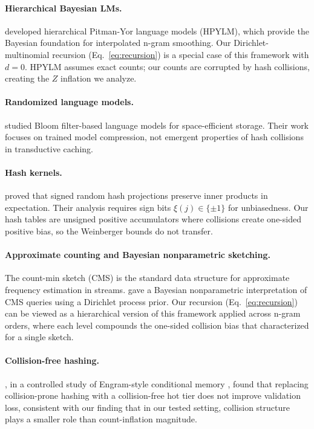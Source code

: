 \documentclass[11pt]{article}
\begin{document}
\paragraph{Hierarchical Bayesian LMs.} \citet{teh2006hierarchical} developed hierarchical Pitman-Yor language models (HPYLM), which provide the Bayesian foundation for interpolated n-gram smoothing. Our Dirichlet-multinomial recursion (Eq.~\ref{eq:recursion}) is a special case of this framework with $d = 0$. HPYLM assumes exact counts; our counts are corrupted by hash collisions, creating the $Z$ inflation we analyze.

\paragraph{Randomized language models.} \citet{talbot2007smoothed} studied Bloom filter-based language models for space-efficient storage. Their work focuses on trained model compression, not emergent properties of hash collisions in transductive caching.

\paragraph{Hash kernels.} \citet{weinberger2009feature} proved that signed random hash projections preserve inner products in expectation. Their analysis requires sign bits $\xi(j) \in \{\pm 1\}$ for unbiasedness. Our hash tables are unsigned positive accumulators where collisions create one-sided positive bias, so the Weinberger bounds do not transfer.

\paragraph{Approximate counting and Bayesian nonparametric sketching.} The count-min sketch (CMS) \citep{cormode2005improved} is the standard data structure for approximate frequency estimation in streams. \citet{cai2018bayesian} gave a Bayesian nonparametric interpretation of CMS queries using a Dirichlet process prior. Our recursion (Eq.~\ref{eq:recursion}) can be viewed as a hierarchical version of this framework applied across n-gram orders, where each level compounds the one-sided collision bias that \citet{cai2018bayesian} characterized for a single sketch.

\paragraph{Collision-free hashing.} \citet{lin2026engram}, in a controlled study of Engram-style conditional memory \citep{cheng2026engram}, found that replacing collision-prone hashing with a collision-free hot tier does not improve validation loss, consistent with our finding that in our tested setting, collision structure plays a smaller role than count-inflation magnitude.
\end{document}
